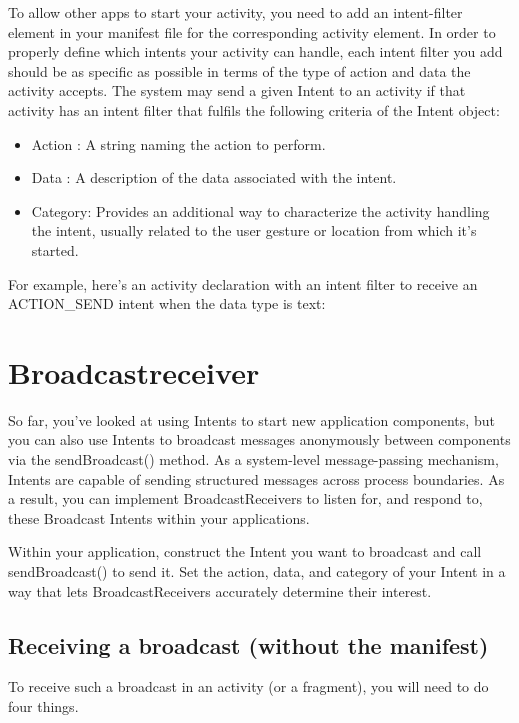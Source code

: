 To allow other apps to start your activity, you need to add an intent-filter element in your manifest file for the corresponding activity element.
In order to properly define which intents your activity can handle, each intent filter you add should be as specific as possible in terms of the type of action and data the activity accepts.
The system may send a given Intent to an activity if that activity has an intent filter that fulfils the following criteria of the Intent object:

\begin{itemize}
	\item Action : A string naming the action to perform.
	\item Data : A description of the data associated with the intent.
	\item Category: Provides an additional way to characterize the activity handling the intent, usually related to the user gesture or location from which it's started.
\end{itemize}

For example, here's an activity declaration with an intent filter to receive an ACTION\_SEND intent when the data type is text:



\section{Broadcastreceiver}
So far, you’ve looked at using Intents to start new application components, but you can also use Intents to broadcast messages anonymously between components via the sendBroadcast() method.
As a system-level message-passing mechanism, Intents are capable of sending structured messages across process boundaries.
As a result, you can implement BroadcastReceivers to listen for, and respond to, these Broadcast Intents within your applications.

Within your application, construct the Intent you want to broadcast and call sendBroadcast() to send it.
Set the action, data, and category of your Intent in a way that lets BroadcastReceivers accurately determine their interest.

\subsection{Receiving a broadcast (without the manifest)}
To receive such a broadcast in an activity (or a fragment), you will need to do four things.

